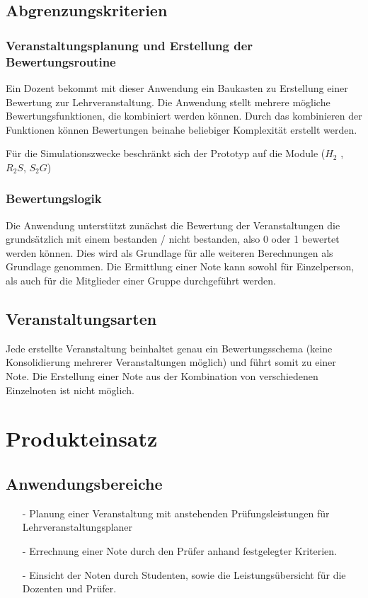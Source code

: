 		\subsection{Abgrenzungskriterien}
		\subsubsection*{Veranstaltungsplanung und Erstellung der Bewertungsroutine}
		
		Ein Dozent bekommt mit dieser Anwendung ein  Baukasten zu Erstellung einer Bewertung zur Lehrveranstaltung. Die Anwendung stellt mehrere mögliche Bewertungsfunktionen, die kombiniert werden können. Durch das kombinieren der Funktionen können Bewertungen beinahe beliebiger Komplexität erstellt werden.
		
		Für die Simulationszwecke beschränkt sich der Prototyp auf die Module ($H_2$ , $R_2S$, $S_2G$)
		
		\subsubsection*{Bewertungslogik}
		
		Die Anwendung unterstützt zunächst die Bewertung der Veranstaltungen die grundsätzlich mit einem bestanden / nicht bestanden, also 0 oder 1 bewertet werden können. Dies wird als Grundlage für alle weiteren Berechnungen als Grundlage genommen. Die Ermittlung einer Note kann sowohl für Einzelperson, als auch für die Mitglieder einer Gruppe durchgeführt werden. 

		\subsection*{Veranstaltungsarten}
		
		Jede erstellte Veranstaltung beinhaltet genau ein Bewertungsschema (keine Konsolidierung mehrerer Veranstaltungen möglich) und führt somit zu einer Note. Die Erstellung einer Note aus der Kombination von verschiedenen Einzelnoten ist nicht möglich.

		
	\section{Produkteinsatz}
	
		
		\subsection{Anwendungsbereiche}
		\begin{itemize}
		\item[-]	Planung einer Veranstaltung mit anstehenden Prüfungsleistungen für Lehrveranstaltungsplaner
		\item[-]	Errechnung einer Note durch den Prüfer anhand festgelegter Kriterien.
		\item[-]	Einsicht der Noten durch Studenten, sowie die Leistungsübersicht für die Dozenten und Prüfer.
		\end{itemize}
		
